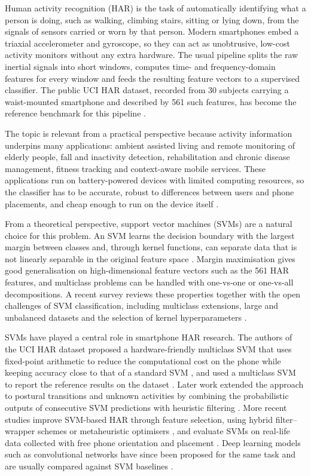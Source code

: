 \documentclass[3p,times,procedia]{elsarticle}
\begin{document}
Human activity recognition (HAR) is the task of automatically identifying what a person is doing, such as walking, climbing stairs, sitting or lying down, from the signals of sensors carried or worn by that person. Modern smartphones embed a triaxial accelerometer and gyroscope, so they can act as unobtrusive, low-cost activity monitors without any extra hardware. The usual pipeline splits the raw inertial signals into short windows, computes time- and frequency-domain features for every window and feeds the resulting feature vectors to a supervised classifier. The public UCI HAR dataset, recorded from 30 subjects carrying a waist-mounted smartphone and described by 561 such features, has become the reference benchmark for this pipeline \citep{anguita2013}.

The topic is relevant from a practical perspective because activity information underpins many applications: ambient assisted living and remote monitoring of elderly people, fall and inactivity detection, rehabilitation and chronic disease management, fitness tracking and context-aware mobile services. These applications run on battery-powered devices with limited computing resources, so the classifier has to be accurate, robust to differences between users and phone placements, and cheap enough to run on the device itself \citep{anguita2012,garciagonzalez2020}.

From a theoretical perspective, support vector machines (SVMs) are a natural choice for this problem. An SVM learns the decision boundary with the largest margin between classes and, through kernel functions, can separate data that is not linearly separable in the original feature space \citep{cortes1995}. Margin maximisation gives good generalisation on high-dimensional feature vectors such as the 561 HAR features, and multiclass problems can be handled with one-vs-one or one-vs-all decompositions. A recent survey reviews these properties together with the open challenges of SVM classification, including multiclass extensions, large and unbalanced datasets and the selection of kernel hyperparameters \citep{cervantes2020}.

SVMs have played a central role in smartphone HAR research. The authors of the UCI HAR dataset proposed a hardware-friendly multiclass SVM that uses fixed-point arithmetic to reduce the computational cost on the phone while keeping accuracy close to that of a standard SVM \citep{anguita2012}, and used a multiclass SVM to report the reference results on the dataset \citep{anguita2013}. Later work extended the approach to postural transitions and unknown activities by combining the probabilistic outputs of consecutive SVM predictions with heuristic filtering \citep{reyesortiz2016}. More recent studies improve SVM-based HAR through feature selection, using hybrid filter--wrapper schemes \citep{ahmed2020} or metaheuristic optimisers \citep{helmi2021}, and evaluate SVMs on real-life data collected with free phone orientation and placement \citep{garciagonzalez2020}. Deep learning models such as convolutional networks have since been proposed for the same task and are usually compared against SVM baselines \citep{ronao2016}.
\end{document}
